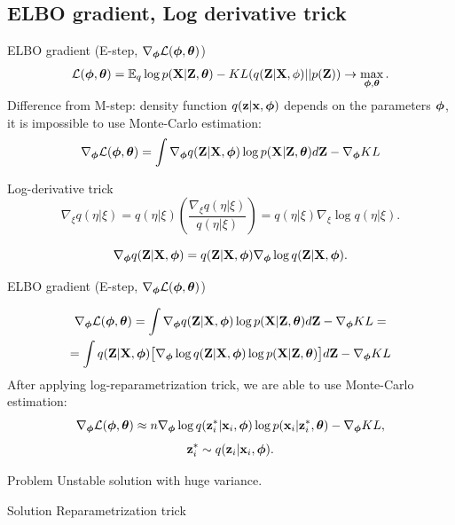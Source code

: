 \documentclass{beamer}
\begin{document}
\subsection{ELBO gradient, Log derivative trick}
\begin{frame}{ELBO gradient (E-step, $\nabla_{\boldsymbol{\phi}} \mathcal{L}(\boldsymbol{\phi}, \boldsymbol{\theta})$)}
\vspace{-0.3cm}
\[
	\mathcal{L} (\boldsymbol{\phi}, \boldsymbol{\theta})  = \mathbb{E}_{q} \log p(\mathbf{X} | \mathbf{Z}, \boldsymbol{\theta}) - KL (q(\mathbf{Z}| \mathbf{X}, \phi) || p(\mathbf{Z})) \rightarrow \max_{\boldsymbol{\phi}, \boldsymbol{\theta}}.
\]
	Difference from M-step: density function $q(\mathbf{z}| \mathbf{x}, \boldsymbol{\phi})$ depends on the parameters $\boldsymbol{\phi}$, it is impossible to use Monte-Carlo estimation:
	\[
		\nabla_{\boldsymbol{\phi}} \mathcal{L} (\boldsymbol{\phi}, \boldsymbol{\theta}) = \int \nabla_{\boldsymbol{\phi}} q(\mathbf{Z}| \mathbf{X}, \boldsymbol{\phi}) \log p(\mathbf{X} |\mathbf{Z}, \boldsymbol{\theta}) d\mathbf{Z} - \nabla_{\boldsymbol{\phi}} KL
	\]
	
	\begin{block}{Log-derivative trick}
	    \[
	    \nabla_\xi q(\eta| \xi) = q(\eta | \xi) \left( \frac{\nabla_\xi q(\eta | \xi)}{q(\eta| \xi)} \right) = q(\eta | \xi) \nabla_\xi \log q(\eta| \xi).
	    \]
	\end{block}
	\[
		\nabla_{\boldsymbol{\phi}} q(\mathbf{Z}| \mathbf{X}, \boldsymbol{\phi}) = q(\mathbf{Z}| \mathbf{X}, \boldsymbol{\phi}) \nabla_{\boldsymbol{\phi}} \log q(\mathbf{Z}| \mathbf{X}, \boldsymbol{\phi}).
	\]
\end{frame}
\begin{frame}{ELBO gradient (E-step, $\nabla_{\boldsymbol{\phi}} \mathcal{L}(\boldsymbol{\phi}, \boldsymbol{\theta})$)}

	\begin{multline*}
		\nabla_{\boldsymbol{\phi}} \mathcal{L} (\boldsymbol{\phi}, \boldsymbol{\theta}) = \int \nabla_{\boldsymbol{\phi}} q(\mathbf{Z}| \mathbf{X}, \boldsymbol{\phi}) \log p(\mathbf{X} |\mathbf{Z}, \boldsymbol{\theta}) d\mathbf{Z}  - \nabla_{\boldsymbol{\phi}} KL = \\ 
		=  \int q(\mathbf{Z}| \mathbf{X}, \boldsymbol{\phi}) \bigl[  \nabla_{\boldsymbol{\phi}} \log q(\mathbf{Z}| \mathbf{X}, \boldsymbol{\phi}) \log p(\mathbf{X} |\mathbf{Z}, \boldsymbol{\theta}) \bigr] d\mathbf{Z} - \nabla_{\boldsymbol{\phi}} KL
	\end{multline*}
	After applying log-reparametrization trick, we are able to use Monte-Carlo estimation:
	\[
		\nabla_{\boldsymbol{\phi}} \mathcal{L} (\boldsymbol{\phi}, \boldsymbol{\theta}) \approx n \nabla_{\boldsymbol{\phi}} \log q(\mathbf{z}_i^*| \mathbf{x}_i, \boldsymbol{\phi}) \log p(\mathbf{x}_i |\mathbf{z}_i^*, \boldsymbol{\theta}) - \nabla_{\boldsymbol{\phi}} KL,
	\]
	\[
		\mathbf{z}_i^* \sim q(\mathbf{z}_i| \mathbf{x}_i, \boldsymbol{\phi}).
	\]
	\vspace{-0.2cm}
	\begin{block}{Problem} 
	Unstable solution with huge variance.
	\end{block}
	\begin{block}{Solution}
	    Reparametrization trick
	\end{block}
\end{frame}
\end{document}

